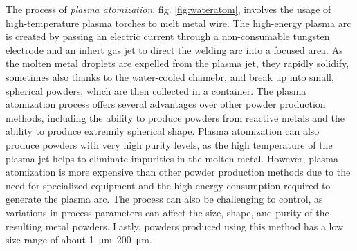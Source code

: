 The process of \emph{plasma atomization}, fig. \ref{fig:wateratom}, involves the usage of high-temperature plasma torches to melt metal wire. The high-energy plasma arc is created by passing an electric current through a non-consumable tungsten electrode and an inhert gas jet to direct the welding arc into a focused area. As the molten metal droplets are expelled from the plasma jet, they rapidly solidify, sometimes also thanks to the water-cooled chamebr, and break up into small, spherical powders, which are then collected in a container. The plasma atomization process offers several advantages over other powder production methods, including the ability to produce powders from reactive metals and the ability to produce extremily spherical shape. Plasma atomization can also produce powders with very high purity levels, as the high temperature of the plasma jet helps to eliminate impurities in the molten metal. However, plasma atomization is more expensive than other powder production methods due to the need for specialized equipment and the high energy consumption required to generate the plasma arc. The process can also be challenging to control, as variations in process parameters can affect the size, shape, and purity of the resulting metal powders. Lastly, powders produced using this method has a low size range of about \SIrange[range-phrase = --]{1}{200}{\micro\metre}. 

